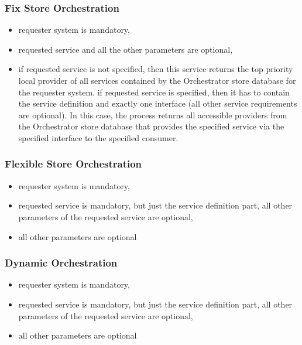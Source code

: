 \documentclass[a4paper]{arrowhead}
\begin{document}
\subsubsection{Fix Store Orchestration}

\begin{itemize}
    \item requester system is mandatory,
    \item requested service and all the other parameters are optional,
    \item if requested service is not specified, then this service returns the top priority local provider of all services contained by the Orchestrator store database for the requester system. if requested service is specified, then it has to contain the service definition and exactly one interface (all other service requirements are optional). In this case, the process returns all accessible providers from the Orchestrator store database that provides the specified service via the specified interface to the specified consumer.
\end{itemize}

\subsubsection{Flexible Store Orchestration}

\begin{itemize}
    \item requester system is mandatory,
    \item requested service is mandatory, but just the service definition part, all other parameters of the requested service are optional,
    \item all other parameters are optional
\end{itemize}    

\subsubsection{Dynamic Orchestration}

\begin{itemize}
    \item requester system is mandatory,
    \item requested service is mandatory, but just the service definition part, all other parameters of the requested service are optional,
    \item all other parameters are optional
\end{itemize}    
    
\end{document}
